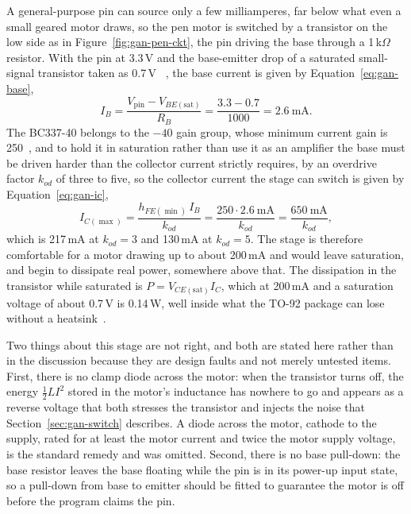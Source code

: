 A general-purpose pin can source only a few milliamperes, far below what even a small geared motor draws, so the pen motor is switched by a transistor on the low side as in Figure~\ref{fig:gan-pen-ckt}, the pin driving the base through a 1\,k$\Omega$ resistor. With the pin at 3.3\,V and the base-emitter drop of a saturated small-signal transistor taken as 0.7\,V~\cite{bc337ds} , the base current is given by Equation~\ref{eq:gan-base},
\begin{equation}
I_B=\frac{V_{\mathrm{pin}}-V_{BE(\mathrm{sat})}}{R_B}=\frac{3.3-0.7}{1000}=2.6\ \mathrm{mA}.
\label{eq:gan-base}
\end{equation}
The BC337-40 belongs to the $-40$ gain group, whose minimum current gain is 250~\cite{bc337ds}, and to hold it in saturation rather than use it as an amplifier the base must be driven harder than the collector current strictly requires, by an overdrive factor $k_{od}$ of three to five, so the collector current the stage can switch is given by Equation~\ref{eq:gan-ic},
\begin{equation}
I_{C(\max)}=\frac{h_{FE(\min)}\,I_B}{k_{od}}=\frac{250\cdot2.6\ \mathrm{mA}}{k_{od}}=\frac{650\ \mathrm{mA}}{k_{od}},
\label{eq:gan-ic}
\end{equation}
which is 217\,mA at $k_{od}=3$ and 130\,mA at $k_{od}=5$.
The stage is therefore comfortable for a motor drawing up to about 200\,mA and would leave saturation, and begin to dissipate real power, somewhere above that.
The dissipation in the transistor while saturated is $P=V_{CE(\mathrm{sat})}I_C$, which at 200\,mA and a saturation voltage of about 0.7\,V is 0.14\,W, well inside what the TO-92 package can lose without a heatsink~\cite{bc337ds}.

Two things about this stage are not right, and both are stated here rather than in the discussion because they are design faults and not merely untested items.
First, there is no clamp diode across the motor: when the transistor turns off, the energy $\tfrac12LI^2$ stored in the motor's inductance has nowhere to go and appears as a reverse voltage that both stresses the transistor and injects the noise that Section~\ref{sec:gan-switch} describes. A diode across the motor, cathode to the supply, rated for at least the motor current and twice the motor supply voltage, is the standard remedy and was omitted.
Second, there is no base pull-down: the base resistor leaves the base floating while the pin is in its power-up input state, so a pull-down from base to emitter should be fitted to guarantee the motor is off before the program claims the pin.

